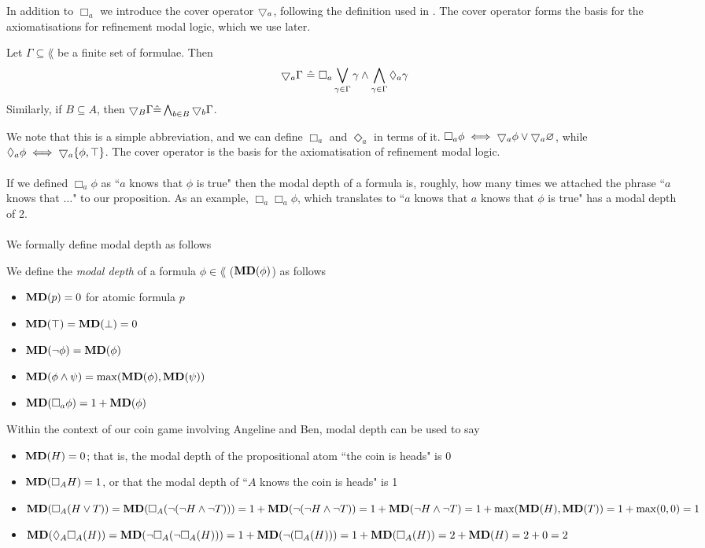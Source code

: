In addition to $\Box_a$ we introduce the cover operator $\bigtriangledown_a$, following the definition used in
\cite{venemaproofsystems}.
The cover operator forms the basis for the axiomatisations for refinement modal logic, which we use
later.

\begin{defn} \label{coverDef}
Let $\Gamma \subseteq \lang$ be a finite set of formulae.
Then
\[
	\bigtriangledown_a \Gamma \text{ } \hat{=} \text{ } \Box_a \bigvee_{\gamma \in \Gamma} \gamma \land
  \bigwedge_{\gamma \in \Gamma} \Diamond_a \gamma
\]
Similarly, if $B \subseteq A$, then $\bigtriangledown_B \Gamma \hat{=} \bigwedge_{b \in B}
\bigtriangledown_b \Gamma$.
\end{defn}
We note that this is a simple abbreviation, and we can define $\Box_a$ and
$\Diamond_a$ in terms of it.
$\Box_a \phi \iff \bigtriangledown_a \phi \lor \bigtriangledown_a \varnothing$, while $\Diamond_a
\phi \iff \bigtriangledown_a \{\phi, \top\}$.
The cover operator is the basis for the axiomatisation of refinement modal logic.\\
\\
If we defined $\Box_a \phi$ as ``$a$ knows that $\phi$ is true" then the modal depth of a formula is, roughly,
how many times we attached the phrase ``$a$ knows that $\ldots$" to our proposition.
As an example, $\Box_a \Box_a \phi$, which translates to ``$a$ knows that $a$ knows that $\phi$ is
true" has a modal depth of 2.\\
\\
We formally define modal depth as follows

\begin{defn} \label{modalDepth}
We define the {\em modal depth} of a formula $\phi \in \lang$ (${\bf MD}(\phi)$) as follows
\begin{itemize}
	\item ${\bf MD}(p) = 0$ for atomic formula $p$
	\item ${\bf MD}(\top) = {\bf MD}(\bot) = 0$
	\item ${\bf MD}(\neg \phi) = {\bf MD}(\phi)$
	\item ${\bf MD}(\phi \land \psi) = \max({\bf MD}(\phi), {\bf MD}(\psi))$
	\item ${\bf MD}(\Box_a \phi) = 1 + {\bf MD}(\phi)$
\end{itemize}
\end{defn}

Within the context of our coin game involving Angeline and Ben, modal depth can be used to say
\begin{itemize}
	\item ${\bf MD}(H) = 0$; that is, the modal depth of the propositional atom ``the coin is heads" is 0
	\item ${\bf MD}(\Box_A H) = 1$, or that the modal depth of ``$A$ knows the coin is heads" is 1
	\item ${\bf MD}(\Box_A (H \lor T)) = {\bf MD}(\Box_A(\neg(\neg H \land \neg T))) = 1 + {\bf MD}(\neg(\neg H
		\land \neg T)) = 1 + {\bf MD}(\neg H \land \neg T) = 1 + \max({\bf MD}(H),{\bf MD}(T)) = 1 + \max(0,0) = 1$
	\item ${\bf MD}(\Diamond_A \Box_A (H)) = {\bf MD}(\neg \Box_A (\neg \Box_A (H))) = 1 + {\bf MD}(\neg(\Box_A(H)))
		= 1 + {\bf MD}(\Box_A(H)) = 2 + {\bf MD}(H) = 2 + 0 =  2$
\end{itemize}

